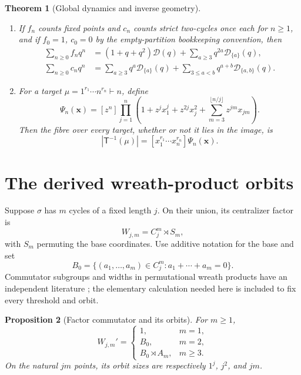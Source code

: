 \documentclass[10pt,a4paper]{amsart}
\newtheorem{theorem}{Theorem}[section]
\newtheorem{proposition}[theorem]{Proposition}
\theoremstyle{definition}
\theoremstyle{remark}
\newcommand{\CT}{\mathsf T}
\newcommand{\D}{\mathcal D}
\begin{document}
\begin{theorem}[Global dynamics and inverse geometry]
\begin{enumerate}[label=\textup{(\roman*)}]
\item If $f_n$ counts fixed points and $c_n$ counts strict two-cycles once
each for $n\geq1$, and if $f_0=1$, $c_0=0$ by the empty-partition
bookkeeping convention, then
\begin{align}
 \sum_{n\geq0}f_nq^n
   &=(1+q+q^2)\D(q)+\sum_{a\geq3}q^{2a}\D_{\{a\}}(q),
                                                               \label{eq:fixed-gf}\\
 \sum_{n\geq0}c_nq^n
   &=\sum_{a\geq3}q^a\D_{\{a\}}(q)
     +\sum_{3\leq a<b}q^{a+b}\D_{\{a,b\}}(q).                 \label{eq:cycle-gf}
\end{align}
\item For a target $\mu=1^{r_1}\cdots n^{r_n}\vdash n$, define
\begin{equation}\label{eq:Psi}
 \Psi_n(\mathbf x)=[z^n]\prod_{j=1}^n
 \left(1+z^jx_1^j+z^{2j}x_j^2
 +\sum_{m=3}^{\lfloor n/j\rfloor}z^{jm}x_{jm}\right).
\end{equation}
Then the fibre over every target, whether or not it lies in the image, is
\begin{equation}\label{eq:fibre}
                |\CT^{-1}(\mu)|=[x_1^{r_1}\cdots x_n^{r_n}]
                \Psi_n(\mathbf x).
\end{equation}
\end{enumerate}
\end{theorem}

\section{The derived wreath-product orbits}

Suppose $\sigma$ has $m$ cycles of a fixed length $j$.  On their union, its
centralizer factor is
\[
 W_{j,m}=C_j^m\rtimes S_m,
\]
with $S_m$ permuting the base coordinates.  Use additive notation for the
base and set
\[
 B_0=\{(a_1,\ldots,a_m)\in C_j^m:a_1+\cdots+a_m=0\}.
\]
Commutator subgroups and widths in permutational wreath products have an
independent literature \cite{Skuratovskii2019}; the elementary calculation
needed here is included to fix every threshold and orbit.

\begin{proposition}[Factor commutator and its orbits]\label{prop:wreath}
For $m\geq1$,
\begin{equation}\label{eq:derived}
 W_{j,m}'=
 \begin{cases}
  1,&m=1,\\
  B_0,&m=2,\\
  B_0\rtimes A_m,&m\geq3.
 \end{cases}
\end{equation}
On the natural $jm$ points, its orbit sizes are respectively
$1^j$, $j^2$, and $jm$.
\end{proposition}
\end{document}
